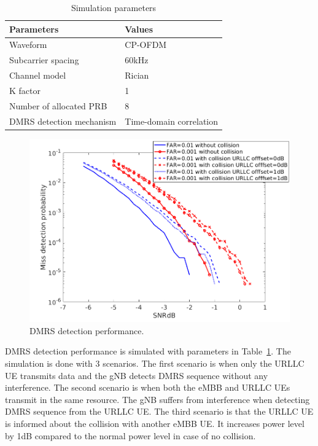 \documentclass{ieeeaccess}
\begin{document}
\begin{table}[htbp]
\caption{Simulation parameters}
\begin{center}
\begin{tabular}{|p{8em}|p{8em}|}
 \hline
 \textbf{Parameters} & \textbf{Values}\\
 \hline
 Waveform & CP-OFDM\\
 \hline
 Subcarrier spacing & 60kHz\\
 \hline
 Channel model & Rician\\
 \hline
 K factor & 1\\
 \hline
 Number of allocated PRB & 8\\
 \hline
 DMRS detection mechanism & Time-domain correlation\\
 

 
 \hline
\end{tabular}
\label{tab5}
\end{center}

\end{table}

\begin{figure}[htbp]
\centerline{\includegraphics[scale=0.33]{fig16.png}}
\caption{DMRS detection performance.}
\label{fig16}
\vspace{-3mm}
\end{figure}

DMRS detection performance is simulated with parameters in Table~\ref{tab5}. The simulation is done with 3 scenarios. The first scenario is when only the URLLC UE transmits data and the gNB detects DMRS sequence without any interference. The second scenario is when both the eMBB and URLLC UEs transmit in the same resource. The gNB suffers from interference when detecting DMRS sequence from the URLLC UE. The third scenario is that the URLLC UE is informed about the collision with another eMBB UE. It increases power level by 1dB compared to the normal power level in case of no collision.
\end{document}
